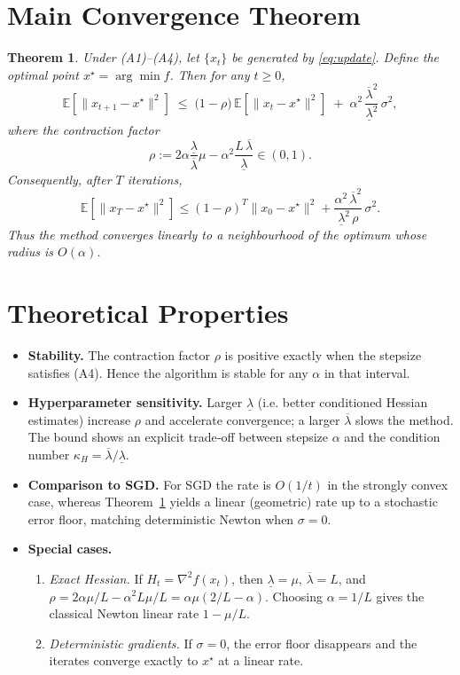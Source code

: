 \documentclass{article}
\newtheorem{theorem}{Theorem}
\newcommand{\E}{\mathbb{E}}
\begin{document}
\section*{Main Convergence Theorem}
\begin{theorem}
\label{thm:linear}
Under (A1)–(A4), let $\{x_{t}\}$ be generated by \eqref{eq:update}. Define the optimal point $x^{\star}=\arg\min f$. Then for any $t\ge0$,
\begin{equation}
\label{eq:linear-rate}
\E\!\left[\|x_{t+1}-x^{\star}\|^{2}\right]
\;\le\;
\bigl(1-\rho\bigr)\,\E\!\left[\|x_{t}-x^{\star}\|^{2}\right]
\;+\;
\alpha^{2}\,\frac{\overline{\lambda}^{2}}{\underline{\lambda}^{2}}\,\sigma^{2},
\end{equation}
where the contraction factor
\[
\rho:=2\alpha\frac{\underline{\lambda}}{\overline{\lambda}}\mu
      -\alpha^{2}\frac{L\,\overline{\lambda}}{\underline{\lambda}}
\in(0,1).
\]
Consequently, after $T$ iterations,
\[
\E\!\left[\|x_{T}-x^{\star}\|^{2}\right]
\le (1-\rho)^{T}\|x_{0}-x^{\star}\|^{2}
   +\frac{\alpha^{2}\,\overline{\lambda}^{2}}{\underline{\lambda}^{2}\,\rho}\,\sigma^{2}.
\]
Thus the method converges linearly to a neighbourhood of the optimum whose radius is $O(\alpha)$.
\end{theorem}

\section*{Theoretical Properties}
\begin{itemize}
\item \textbf{Stability.} The contraction factor $\rho$ is positive exactly when the stepsize satisfies (A4). Hence the algorithm is stable for any $\alpha$ in that interval.

\item \textbf{Hyperparameter sensitivity.} Larger $\underline{\lambda}$ (i.e. better conditioned Hessian estimates) increase $\rho$ and accelerate convergence; a larger $\overline{\lambda}$ slows the method. The bound shows an explicit trade‑off between stepsize $\alpha$ and the condition number $\kappa_{H}=\overline{\lambda}/\underline{\lambda}$.

\item \textbf{Comparison to SGD.} For SGD the rate is $O(1/t)$ in the strongly convex case, whereas Theorem~\ref{thm:linear} yields a linear (geometric) rate up to a stochastic error floor, matching deterministic Newton when $\sigma=0$.

\item \textbf{Special cases.}
    \begin{enumerate}
        \item \emph{Exact Hessian.} If $H_{t}=\nabla^{2}f(x_{t})$, then $\underline{\lambda}=\mu$, $\overline{\lambda}=L$, and $\rho=2\alpha\mu/L-\alpha^{2}L\mu/L= \alpha\mu(2/L-\alpha)$. Choosing $\alpha=1/L$ gives the classical Newton linear rate $1-\mu/L$.
        \item \emph{Deterministic gradients.} If $\sigma=0$, the error floor disappears and the iterates converge exactly to $x^{\star}$ at a linear rate.
    \end{enumerate}
\end{itemize}
\end{document}
